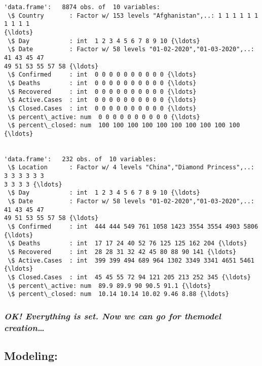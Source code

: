 \documentclass[11pt]{article}
\begin{document}
    \begin{Verbatim}[commandchars=\\\{\}]
'data.frame':   8874 obs. of  10 variables:
 \$ Country       : Factor w/ 153 levels "Afghanistan",..: 1 1 1 1 1 1 1 1 1 1
{\ldots}
 \$ Day           : int  1 2 3 4 5 6 7 8 9 10 {\ldots}
 \$ Date          : Factor w/ 58 levels "01-02-2020","01-03-2020",..: 41 43 45 47
49 51 53 55 57 58 {\ldots}
 \$ Confirmed     : int  0 0 0 0 0 0 0 0 0 0 {\ldots}
 \$ Deaths        : int  0 0 0 0 0 0 0 0 0 0 {\ldots}
 \$ Recovered     : int  0 0 0 0 0 0 0 0 0 0 {\ldots}
 \$ Active.Cases  : int  0 0 0 0 0 0 0 0 0 0 {\ldots}
 \$ Closed.Cases  : int  0 0 0 0 0 0 0 0 0 0 {\ldots}
 \$ percent\_active: num  0 0 0 0 0 0 0 0 0 0 {\ldots}
 \$ percent\_closed: num  100 100 100 100 100 100 100 100 100 100 {\ldots}


'data.frame':   232 obs. of  10 variables:
 \$ Location      : Factor w/ 4 levels "China","Diamond Princess",..: 3 3 3 3 3 3
3 3 3 3 {\ldots}
 \$ Day           : int  1 2 3 4 5 6 7 8 9 10 {\ldots}
 \$ Date          : Factor w/ 58 levels "01-02-2020","01-03-2020",..: 41 43 45 47
49 51 53 55 57 58 {\ldots}
 \$ Confirmed     : int  444 444 549 761 1058 1423 3554 3554 4903 5806 {\ldots}
 \$ Deaths        : int  17 17 24 40 52 76 125 125 162 204 {\ldots}
 \$ Recovered     : int  28 28 31 32 42 45 80 88 90 141 {\ldots}
 \$ Active.Cases  : int  399 399 494 689 964 1302 3349 3341 4651 5461 {\ldots}
 \$ Closed.Cases  : int  45 45 55 72 94 121 205 213 252 345 {\ldots}
 \$ percent\_active: num  89.9 89.9 90 90.5 91.1 {\ldots}
 \$ percent\_closed: num  10.14 10.14 10.02 9.46 8.88 {\ldots}
    \end{Verbatim}

    \hypertarget{ok-everything-is-set.-now-we-can-go-for-themodel-creation}{%
\subsubsection{\texorpdfstring{\emph{OK! Everything is set. Now we can
go for themodel
creation\ldots{}}}{OK! Everything is set. Now we can go for themodel creation\ldots{}}}\label{ok-everything-is-set.-now-we-can-go-for-themodel-creation}}

    

    

    \hypertarget{modeling}{%
\subsection{Modeling:}\label{modeling}}
\end{document}

